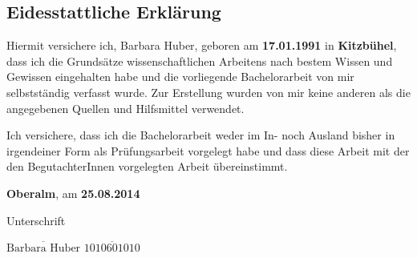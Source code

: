 \subsection*{Eidesstattliche Erklärung}

Hiermit versichere ich, Barbara Huber, geboren am {\bf 17.01.1991} in {\bf Kitzbühel}, dass ich die Grundsätze wissenschaftlichen Arbeitens nach bestem Wissen und Gewissen eingehalten habe und die vorliegende Bachelorarbeit von mir selbstständig verfasst wurde. Zur Erstellung wurden von mir keine anderen als die angegebenen Quellen und Hilfsmittel verwendet. 

Ich versichere, dass ich die Bachelorarbeit weder im In- noch Ausland bisher in irgendeiner Form als Prüfungsarbeit vorgelegt habe und dass diese Arbeit mit der den BegutachterInnen vorgelegten Arbeit übereinstimmt.


\vspace*{3cm}

{\bf Oberalm}, am {\bf 25.08.2014}


\hfill


Unterschrift

\vspace*{1cm}

$\overline{\text{Barbara Huber}}$ \hfill	$\overline{\text{1010601010}}$

